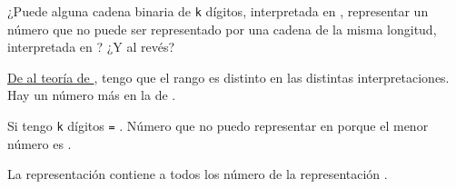 \begin{enunciado}{\ejercicio}
  ¿Puede alguna cadena binaria de \texttt{k} dígitos, interpretada en \compDos,
  representar un número que no puede ser representado por una cadena de la misma longitud, interpretada en \sigMag?
  ¿Y al revés?
\end{enunciado}

\hyperlink{teoria-1:complementoA2}{De al teoría de \compDos}, tengo que el rango es distinto en las distintas interpretaciones. Hay
un número más en la de \compDos.\par

Si tengo \texttt{k} dígitos 
 \texttt{=} .
Número que no puedo representar en \sigMag porque el menor número es .\par

La representación \compDos contiene a todos los número de la representación \sigMag.

